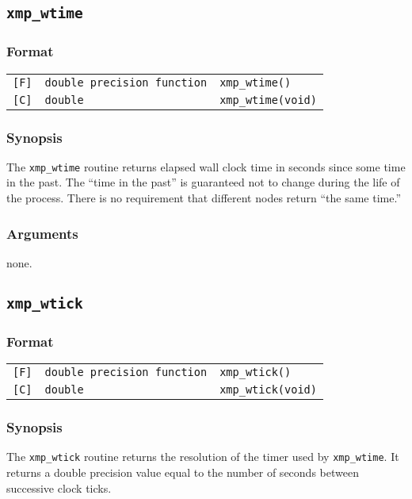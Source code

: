 \subsection{\tt xmp\_wtime}

\subsubsection*{Format}

\begin{tabular}{lll}
\verb![F]!&  {\tt double precision function}& {\tt xmp\_wtime()}\\
\verb![C]!&  {\tt double}& {\tt xmp\_wtime(void)}
\end{tabular}

\subsubsection*{Synopsis}
The {\tt xmp\_wtime} routine returns elapsed wall clock time in seconds 
since some time in the past. The ``time in the past'' is guaranteed
not to change during the life of the process.
There is no requirement that different nodes return ``the same time.''

\subsubsection*{Arguments}
none.

\subsection{\tt xmp\_wtick}

\subsubsection*{Format}

\begin{tabular}{lll}
\verb![F]!&  {\tt double precision function}& {\tt xmp\_wtick()}\\
\verb![C]!&  {\tt double}& {\tt xmp\_wtick(void)}
\end{tabular}

\subsubsection*{Synopsis}
The {\tt xmp\_wtick} routine returns the resolution of the timer
used by {\tt xmp\_wtime}. 
It returns a double precision value equal to the number of seconds 
between successive clock ticks.

